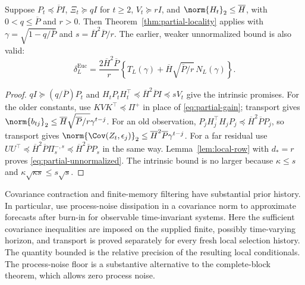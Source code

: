 \begin{corollary}
\label{cor:partial-euclidean}
Suppose $P_t\preceq\overline P I$, $\Xi_t\succeq qI$ for $t\ge2$,
$V_t\succeq rI$, and $\norm{H_t}_2\le\overline H$, with
$0<q\le\overline P$ and $r>0$. Then
Theorem~\ref{thm:partial-locality} applies with
$\gamma=\sqrt{1-q/\overline P}$ and $s=\overline H^2\overline P/r$.
The earlier, weaker unnormalized bound is also valid:
\begin{equation}
 \delta_L^{\mathrm{Euc}}=
 \frac{2\overline H^2\overline P}{r}
 \left\{T_L(\gamma)+\overline H\sqrt{\overline P/r}\,N_L(\gamma)\right\}.
 \label{eq:partial-unnormalized}
\end{equation}
\end{corollary}
\begin{proof}
$qI\succeq(q/\overline P)P_t$ and
$H_tP_tH_t^\top\preceq\overline H^2\overline P I\preceq sV_t$
give the intrinsic promises. For the older constants, use
$KVK^\top\preceq\Pi^+$ in place of
\eqref{eq:partial-gain}; transport gives
$\norm{b_{tj}}_2\le\overline H\sqrt{\overline P/r}\gamma^{t-j}$.
For an old observation, $P_jH_j^\top H_jP_j
\preceq\overline H^2\overline P P_j$, so transport gives
$\norm{\Cov(Z_t,\epsilon_j)}_2
\le\overline H^2\overline P\gamma^{t-j}$.
For a far residual use
$UU^\top\preceq\overline H^2\overline P\Pi_s^{-,s}
\preceq\overline H^2\overline P P_s$ in the same way.
Lemma~\ref{lem:local-row} with $d_*=r$ proves
\eqref{eq:partial-unnormalized}. The intrinsic bound is no larger because
$\kappa\le s$ and $\kappa\sqrt{\kappa s}\le s\sqrt s$.
\end{proof}

Covariance contraction and finite-memory filtering have substantial prior
history. In particular, \citet[Theorems 1--2]{Kozdoba2019} use process-noise
dissipation in a covariance norm to approximate forecasts after burn-in for
observable time-invariant systems. Here the sufficient covariance inequalities
are imposed on the supplied finite, possibly time-varying horizon, and
transport is proved separately for every fresh local selection history.
The quantity bounded is the relative precision of the resulting local
conditionals. The process-noise floor is a substantive alternative to the
complete-block theorem, which allows zero process noise.

